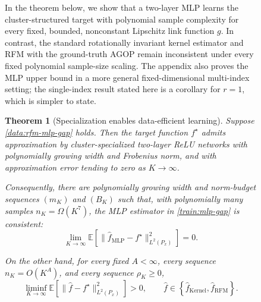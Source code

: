 \documentclass{article}
\newcounter{setting}[section]
\newcounter{trainingsetup}
\newtheorem{theorem}{Theorem}
\begin{document}
\begin{figure}
\begin{trainingsetup}
\end{trainingsetup}



\endgroup


In the theorem below, we show that a two-layer MLP learns the
cluster-structured target with polynomial sample complexity for every fixed,
bounded, nonconstant Lipschitz link function $g$. In contrast, the standard rotationally
invariant kernel estimator and RFM with the ground-truth AGOP remain
inconsistent under every fixed polynomial sample-size scaling. The appendix
also proves the MLP upper bound in a more general fixed-dimensional
multi-index setting; the single-index result stated here is a
corollary for $r=1$, which is simpler to state.



\begin{theorem}[Specialization enables data-efficient learning]
\label{thm:rfm-mlp-gap}
Suppose \cref{data:rfm-mlp-gap} holds. Then the target function $f^\star$ admits approximation by cluster-specialized two-layer
ReLU networks with polynomially growing width and Frobenius norm,
and with approximation error tending to zero as $K\to\infty$.

Consequently, there are polynomially growing width
and norm-budget sequences $(m_K)$ and $(B_K)$ such that, with polynomially many samples $n_K=\Omega(K^{7})$,
the MLP estimator in \cref{train:mlp-gap} is consistent:
\[
    \lim_{K\to\infty}
    \mathbb E\left[
        \|\widehat f_{\mathrm{MLP}}-f^\star\|_{L^2(P_x)}^2
    \right]
    =0.
\]

On the other hand, for every fixed $A<\infty$, every sequence
$n_K=O(K^A)$, and every sequence $\rho_K\geq0$,
\[
    \liminf_{K\to\infty}
    \mathbb E\left[
        \|\widehat f-f^\star\|_{L^2(P_x)}^2
    \right]
    >0,
    \qquad
    \widehat f\in
    \left\{
        \widehat f_{\mathrm{Kernel}},
        \widehat f_{\mathrm{RFM}}
    \right\}.
\]
\end{theorem}







\end{figure}
\end{document}
